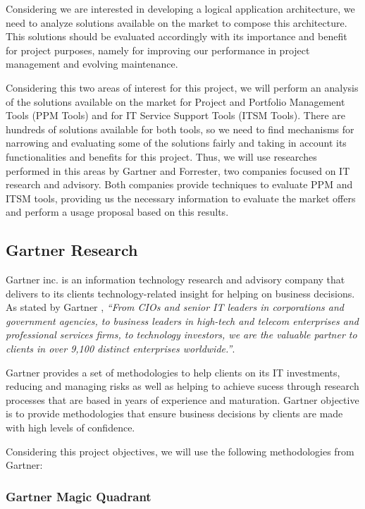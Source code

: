 Considering we are interested in developing a logical application architecture, we need to analyze solutions available on the market to compose this architecture. This solutions should be evaluated accordingly with its importance and benefit for project purposes, namely for improving our performance in project management and evolving maintenance.\par
Considering this two areas of interest for this project, we will perform an analysis of the solutions available on the market for Project and Portfolio Management Tools (PPM Tools) and for IT Service Support Tools (ITSM Tools). There are hundreds of solutions available for both tools, so we need to find mechanisms for narrowing and evaluating some of the solutions fairly and taking in account its functionalities and benefits for this project. Thus, we will use researches performed in this areas by Gartner and Forrester, two companies focused on IT research and advisory. Both companies provide techniques to evaluate PPM and ITSM tools, providing us the necessary information to evaluate the market offers and perform a usage proposal based on this results.\par

\subsection{Gartner Research}

Gartner inc. is an information technology research and advisory company that delivers to its clients technology-related insight for helping on business decisions. As stated by Gartner \cite{GartnerAbout}, \textit{``From CIOs and senior IT leaders in corporations and government agencies, to business leaders in high-tech and telecom enterprises and professional services firms, to technology investors, we are the valuable partner to clients in over 9,100 distinct enterprises worldwide.''}.\par
Gartner provides a set of methodologies to help clients on its IT investments, reducing and managing risks as well as helping to achieve sucess through research processes that are based in years of experience and maturation. Gartner objective is to provide methodologies that ensure business decisions by clients are made with high levels of confidence.\par
Considering this project objectives, we will use the following methodologies from Gartner:

\subsubsection{Gartner Magic Quadrant}

